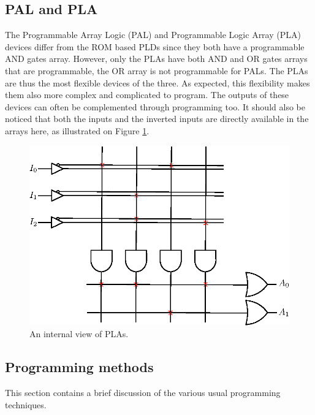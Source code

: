 \subsection{PAL and PLA}

The Programmable Array Logic (PAL) and Programmable Logic Array (PLA) devices differ from the ROM 
based PLDs since they both have a programmable AND gates array. However, only the PLAs have both AND and
OR gates arrays that are programmable, the OR array is not programmable for PALs. The PLAs are thus 
the most flexible devices of the three.
As expected, this flexibility makes them also more complex and complicated to program. The outputs
of these devices can often be complemented through programming too. It should also be noticed
that both the inputs and the inverted inputs are directly available in the arrays here, as illustrated on
Figure \ref{fig:fpga/pld_pla_internal}. 

\begin{figure}[H]
    \centering
    \includegraphics[scale=0.8]{Chapter1-Hardware/res/pld_pla}
    \caption{An internal view of PLAs.}
    \label{fig:fpga/pld_pla_internal}
\end{figure}

\subsection{Programming methods}

This section contains a brief discussion of the various usual programming techniques.
 
